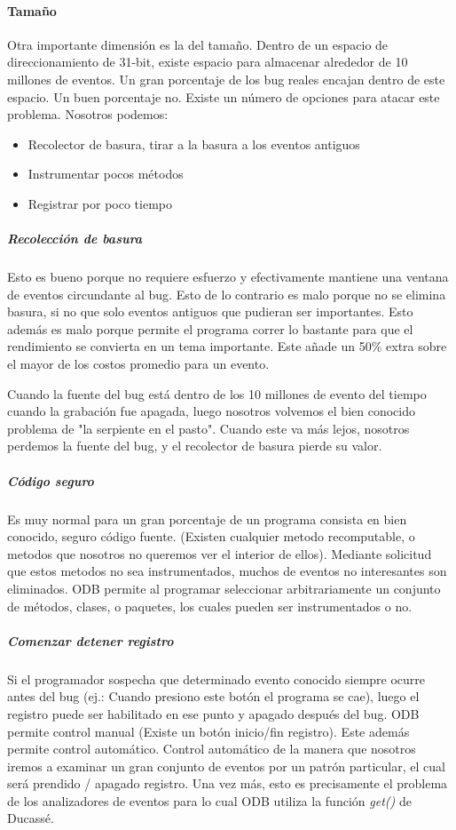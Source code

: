 \documentclass[12pt,legalpaper]{report}
\begin{document}
				\paragraph{Tamaño}

Otra importante dimensión es la del tamaño.  Dentro de un espacio de direccionamiento de 31-bit, existe espacio para almacenar alrededor de 10 millones de eventos.  Un gran porcentaje de los bug reales encajan dentro de este espacio.  Un buen porcentaje no.  Existe un número de opciones para atacar este problema.  Nosotros podemos:
\begin{itemize}
	\item Recolector de basura, tirar a la basura a los eventos antiguos
	\item Instrumentar pocos métodos
	\item Registrar por poco tiempo 
\end{itemize}

					\subparagraph{Recolección de basura}

Esto es bueno porque no requiere esfuerzo y efectivamente mantiene una ventana de eventos circundante al bug.  Esto de lo contrario es malo porque no se elimina basura, si no que solo eventos antiguos que pudieran ser importantes.  Esto además es malo porque permite el programa correr lo bastante para que el rendimiento se convierta en un tema importante.  Este añade un 50\% extra sobre el mayor de los costos promedio para un evento.

Cuando la fuente del bug está dentro de los 10 millones de evento del tiempo cuando la grabación fue apagada, luego nosotros volvemos el bien conocido problema de "la serpiente en el pasto". Cuando este va más lejos, nosotros perdemos la fuente del bug, y el recolector de basura pierde su valor.

					\subparagraph{Código seguro}

Es muy normal para un gran porcentaje de un programa consista en bien conocido, seguro código fuente. (Existen cualquier metodo recomputable, o metodos que nosotros no queremos ver el interior de ellos).  Mediante solicitud que estos metodos no sea instrumentados, muchos de eventos no interesantes son eliminados.  ODB permite al programar seleccionar arbitrariamente un conjunto de métodos, clases, o paquetes, los cuales pueden ser instrumentados o no.

					\subparagraph{Comenzar detener registro}

Si el programador sospecha que determinado evento conocido siempre ocurre antes del bug (ej.: Cuando presiono este botón el programa se cae), luego el registro puede ser habilitado en ese punto y apagado después del bug.  ODB permite control manual (Existe un botón inicio/fin registro).  Este además permite control automático.  Control automático de la manera que nosotros iremos a examinar un gran conjunto de eventos por un patrón particular, el cual será prendido / apagado registro.  Una vez más, esto es precisamente el problema de los analizadores de eventos para lo cual ODB utiliza la función \textit{get()} de Ducassé.
\end{document}
